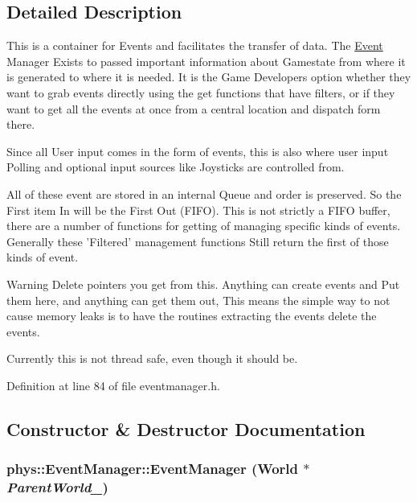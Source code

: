 \subsection{Detailed Description}
This is a container for Events and facilitates the transfer of data. The \hyperlink{classphys_1_1Event}{Event} Manager Exists to passed important information about Gamestate from where it is generated to where it is needed. It is the Game Developers option whether they want to grab events directly using the get functions that have filters, or if they want to get all the events at once from a central location and dispatch form there. \par
 Since all User input comes in the form of events, this is also where user input Polling and optional input sources like Joysticks are controlled from. \par
 All of these event are stored in an internal Queue and order is preserved. So the First item In will be the First Out (FIFO). This is not strictly a FIFO buffer, there are a number of functions for getting of managing specific kinds of events. Generally these 'Filtered' management functions Still return the first of those kinds of event. \begin{DoxyWarning}{Warning}
Delete pointers you get from this. Anything can create events and Put them here, and anything can get them out, This means the simple way to not cause memory leaks is to have the routines extracting the events delete the events. 

Currently this is not thread safe, even though it should be. 
\end{DoxyWarning}


Definition at line 84 of file eventmanager.h.



\subsection{Constructor \& Destructor Documentation}
\hypertarget{classphys_1_1EventManager_a148f8c559642d3d50206169b3d0406be}{
\subsubsection[{EventManager}]{\setlength{\rightskip}{0pt plus 5cm}phys::EventManager::EventManager ({\bf World} $\ast$ {\em ParentWorld\_\-})}}
\label{da/dde/classphys_1_1EventManager_a148f8c559642d3d50206169b3d0406be}


